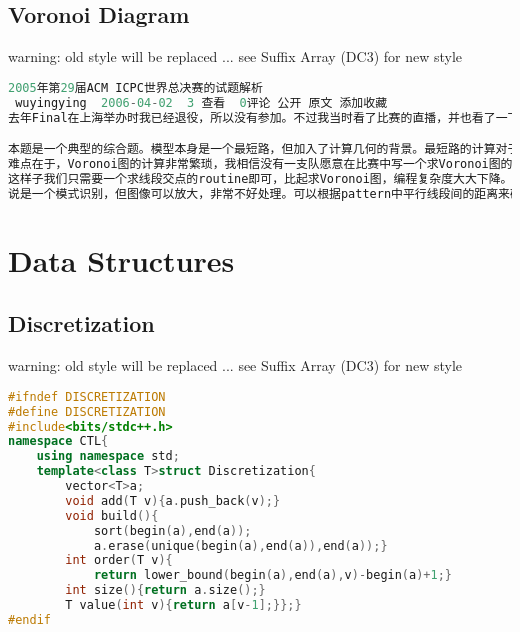 \documentclass{book}
\begin{document}
\section{Voronoi Diagram}
warning: old style will be replaced ... see Suffix Array (DC3) for new style\begin{lstlisting}[language=C++,title={Voronoi Diagram.hpp (873 bytes, 8 lines)}]
﻿2005年第29届ACM ICPC世界总决赛的试题解析
 wuyingying  2006-04-02  3 查看  0评论 公开 原文 添加收藏 
去年Final在上海举办时我已经退役，所以没有参加。不过我当时看了比赛的直播，并也看了一下题目。我刚刚又重新看了一下题目，写了一篇对题目算法的简要分析，在此与大家探讨。

本题是一个典型的综合题。模型本身是一个最短路，但加入了计算几何的背景。最短路的计算对于参加World Final的选手自然是小菜一碟，但此题中每条边的cost是什么？由题目的描述可知，每条边的cost是穿过的cell的个数。那么cell由什么来划分？每个tower对应的cell就是一个离这个tower比离其它tower都要近的区域。这样的区域是什么？学过计算几何的可能知道，所有的cell构成的一个平面划分是一个Voronoi图，Voronoi图可以在O(nlogn)的时间里求出。所以本题划分为两个步骤：一是求出Voronoi图并计算每条边的费用，二是计算最短路。
难点在于，Voronoi图的计算非常繁琐，我相信没有一支队愿意在比赛中写一个求Voronoi图的程序，所以我们要换一种方法。关键在于，怎样判断一个线段是否穿过了一个cell？每个cell都是一些由中垂线围成的凸多边形，如果穿过了这个cell，就必然会有交点，而这个交点一定是该线段和某条中垂线的交点。所以问题立刻变得简单：要计算线段AB是否穿过tower Pi的cell，只需要枚举PiPj的中垂线和AB的交点，再判断这个交点是否离Pi比所有其它Pj都近，如果存在这样的交点，则AB穿过Pi的cell。
这样子我们只需要一个求线段交点的routine即可，比起求Voronoi图，编程复杂度大大下降。而算法的时间复杂度也是可以接受的。
说是一个模式识别，但图像可以放大，非常不好处理。可以根据pattern中平行线段间的距离来确定放大的倍数，然后再到图里面进行枚举匹配。但不仅要分情况讨论，还要注意精度。是一道算法和编程都十分繁琐的题目。\end{lstlisting}
\chapter{Data Structures}
\newpage
{}
\section{Discretization}
warning: old style will be replaced ... see Suffix Array (DC3) for new style\begin{lstlisting}[language=C++,title={Discretization.hpp (511 bytes, 16 lines)}]
#ifndef DISCRETIZATION
#define DISCRETIZATION
#include<bits/stdc++.h>
namespace CTL{
    using namespace std;
    template<class T>struct Discretization{
        vector<T>a;
        void add(T v){a.push_back(v);}
        void build(){
            sort(begin(a),end(a));
            a.erase(unique(begin(a),end(a)),end(a));}
        int order(T v){
            return lower_bound(begin(a),end(a),v)-begin(a)+1;}
        int size(){return a.size();}
        T value(int v){return a[v-1];}};}
#endif\end{lstlisting}
\end{document}

